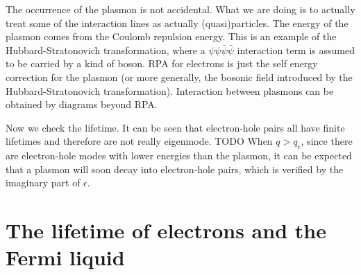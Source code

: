 \documentclass[hyperref, a4paper]{article}
\begin{document}
\begin{note*}{}
    The occurrence of the plasmon is not accidental. What we are doing is to actually treat some of the 
    interaction lines as actually (quasi)particles. The energy of the plasmon comes from the Coulomb 
    repulsion energy. This is an example of the Hubbard-Stratonovich transformation, where a $\psi \psi 
    \bar{\psi} \bar{\psi}$ interaction term is assumed to be carried by a kind of boson. RPA for electrons 
    is just the self energy correction for the plasmon (or more generally, the bosonic field introduced 
    by the Hubbard-Stratonovich transformation). Interaction between plasmons can be obtained by diagrams 
    beyond RPA. 
\end{note*}

Now we check the lifetime. It can be seen that electron-hole pairs all have finite lifetimes and therefore 
are not really eigenmode. TODO When $q > q_\text{c}$, since there are electron-hole modes with lower energies 
than the plasmon, it can be expected that a plasmon will soon decay into electron-hole pairs, which is 
verified by the imaginary part of $\epsilon$. 

\section{The lifetime of electrons and the Fermi liquid}
\end{document}
